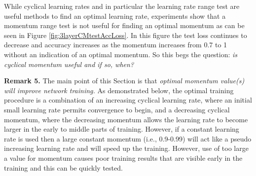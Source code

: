 \documentclass{article} %
\begin{document}
While cyclical learning rates and in particular the learning rate range test \citep{smith2017cyclical} are useful methods to find an optimal learning rate, experiments show that a momentum range test is not useful for finding an optimal momentum as can be seen in Figure \ref{fig:3layerCMtestAccLoss}.  In this figure the test loss continues to decrease and accuracy increases as the momentum increases from 0.7 to 1 without an indication of an optimal momentum.  So this begs the question:  \emph{is cyclical momentum useful and if so, when?} 

\textbf{Remark 5.}
The main point of this Section is that \emph{optimal momentum value(s) will improve network training. }  As demonstrated below, the optimal training procedure is a combination of an increasing cyclical learning rate, where an initial small learning rate permits convergence to begin,  and a decreasing cyclical momentum, where the decreasing momentum allows the learning rate to become larger in the early to middle parts of training.  However, if a constant learning rate is used then a large constant momentum (i.e., 0.9-0.99) will act like a pseudo increasing learning rate and will speed up the training.  However, use of too large a value for momentum causes poor training results that are visible early in the training and this can be quickly tested. 
\end{document}
